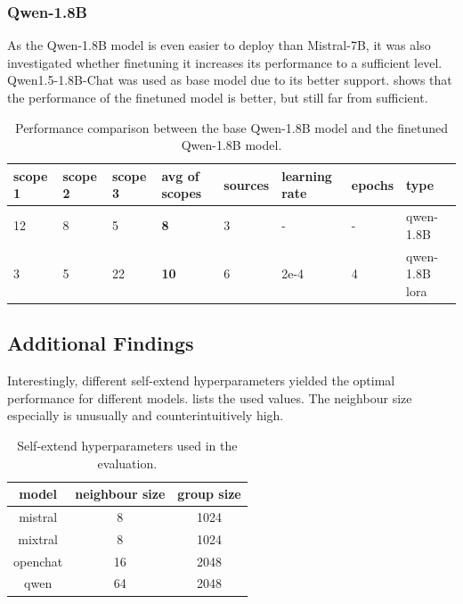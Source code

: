 \documentclass[]{article}
\begin{document}
\subsubsection{Qwen-1.8B}

As the Qwen-1.8B model is even easier to deploy than Mistral-7B, it was also investigated whether finetuning it increases its performance to a sufficient level. Qwen1.5-1.8B-Chat was used as base model due to its better support.  shows that the performance of the finetuned model is better, but still far from sufficient.

\begin{table}[h]
	\centering
	\begin{tabular}{|l|l|l|l|l|l|l|l|}
		\hline
		scope 1 & scope 2 & scope 3 & avg of scopes & sources & learning rate & epochs & type \\\hline
		12 & 8 & 5 & \textbf{8} & 3 & - & - & qwen-1.8B \\\hline
		3 & 5 & 22 & \textbf{10} & 6 & 2e-4 & 4 & qwen-1.8B lora \\\hline
	\end{tabular}
	\caption{Performance comparison between the base Qwen-1.8B model and the finetuned Qwen-1.8B model.}
	\label{tab:qwen-comparison}
\end{table}	
	
	\subsection{Additional Findings}
	
	
	Interestingly, different self-extend hyperparameters yielded the optimal performance for different models.  lists the used values. The neighbour size especially is unusually and counterintuitively high.
	
	\begin{table}[h!]
		\centering
			\begin{tabularx}{.5\textwidth}{ccc}
				\toprule
				model & neighbour size & group size \\
				\midrule
				mistral & 8 & 1024 \\
				mixtral & 8 & 1024 \\
				openchat & 16 & 2048 \\
				qwen & 64 & 2048 \\
				\bottomrule
			\end{tabularx}
			\caption{Self-extend hyperparameters used in the evaluation.}
			\label{tab:self-extend-params}
	\end{table}
	
\end{document}
